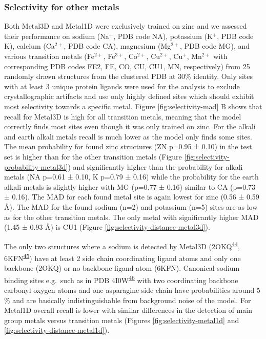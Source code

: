 \documentclass[ lineno,
  9pt]{elife}
\begin{document}
\hypertarget{selectivity-for-other-metals}{%
\subsubsection{Selectivity for other metals}\label{selectivity-for-other-metals}}

Both Metal3D and Metal1D were exclusively trained on zinc and we assessed their performance on sodium (Na$^+$, PDB code NA), potassium (K$^+$, PDB code K), calcium (Ca$^{2+}$, PDB code CA), magnesium (Mg$^{2+}$, PDB code MG), and various transition metals (Fe$^{2+}$, Fe$^{3+}$, Co$^{2+}$, Cu$^{2+}$, Cu$^+$, Mn$^{2+}$ with corresponding PDB codes FE2, FE, CO, CU, CU1, MN, respectively) from 25 randomly drawn structures from the clustered PDB at 30\% identity. Only sites with at least 3 unique protein ligands were used for the analysis to exclude crystallographic artifacts and use only highly defined sites which should exhibit most selectivity towards a specific metal. Figure \ref{fig:selectivity-mad} B shows that recall for Metal3D is high for all transition metals, meaning that the model correctly finds most sites even though it was only trained on zinc. For the alkali and earth alkali metals recall is much lower as the model only finds some sites. The mean probability for found zinc structures (ZN p=0.95 ± 0.10) in the test set is higher than for the other transition metals (Figure \ref{fig:selectivity-probability-metal3d}) and significantly higher than the probability for alkali metals (NA p=0.61 ± 0.10, K p=0.79 ± 0.16) while the probability for the earth alkali metals is slightly higher with MG (p=0.77 ± 0.16) similar to CA (p=0.73 ± 0.16). The MAD for each found metal site is again lowest for zinc (0.56 ± 0.59 \AA ). The MAD for the found sodium (n=2) and potassium (n=5) sites are as low as for the other transition metals. The only metal with significantly higher MAD (1.45 ± 0.93 \AA ) is CU1 (Figure \ref{fig:selectivity-distance-metal3d}).

The only two structures where a sodium is detected by Metal3D (2OKQ\textsuperscript{\protect\hyperlink{ref-Qubi5dZD}{44}}, 6KFN\textsuperscript{\protect\hyperlink{ref-g7lHXZp5}{45}}) have at least 2 side chain coordinating ligand atoms and only one backbone (2OKQ) or no backbone ligand atom (6KFN). Canonical sodium binding sites e.g.~such as in PDB 4I0W\textsuperscript{\protect\hyperlink{ref-w9ECLZDp}{46}} with two coordinating backbone carbonyl oxygen atoms and one asparagine side chain have probabilities around 5 \% and are basically indistinguishable from background noise of the model.
For Metal1D overall recall is lower with similar differences in the detection of main group metals versus transition metals (Figures \ref{fig:selectivity-metal1d} and \ref{fig:selectivity-distance-metal1d}).
\end{document}
